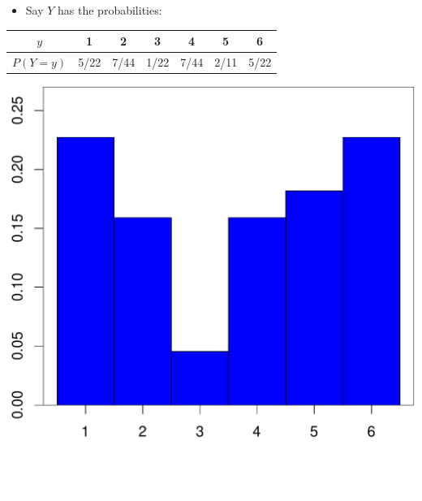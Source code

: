 \documentclass[handout]{beamer}\usepackage[]{graphicx}\usepackage[]{color}
\newenvironment{knitrout}{}{} %
\providecommand{\q}{$\quad$ \newline}
\numberwithin{equation}{section}
\begin{document}
\begin{frame}
\begin{itemize}
\item Say $Y$ has the probabilities: \q 
\end{itemize}
\begin{tabular}{ccccccc}
$y$ & 1 & 2 & 3 & 4 & 5 & 6 \\ \hline
$P(Y = y)$ & 5/22 & 7/44 & 1/22 & 7/44 & 2/11 & 5/22
\end{tabular} 

\begin{center}
\begin{knitrout}
\color{fgcolor}
\includegraphics[width=.6\textwidth,height=.6\textheight]{figure/unnamed-chunk-3-1} 

\end{knitrout}
\end{center}

\end{frame}
\end{document}
